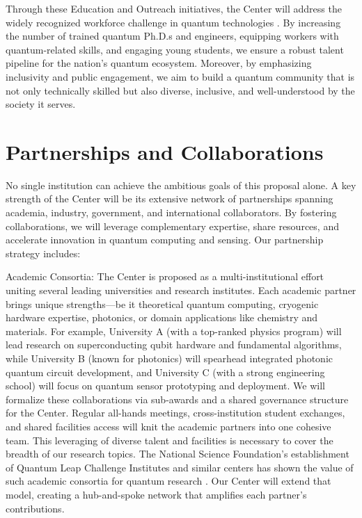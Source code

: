 \documentclass[12pt]{article}
\begin{document}
Through these Education and Outreach initiatives, the Center will address the widely recognized workforce challenge in quantum technologies . By increasing the number of trained quantum Ph.D.s and engineers, equipping workers with quantum-related skills, and engaging young students, we ensure a robust talent pipeline for the nation’s quantum ecosystem. Moreover, by emphasizing inclusivity and public engagement, we aim to build a quantum community that is not only technically skilled but also diverse, inclusive, and well-understood by the society it serves.



\section{Partnerships and Collaborations}



No single institution can achieve the ambitious goals of this proposal alone. A key strength of the Center will be its extensive network of partnerships spanning academia, industry, government, and international collaborators. By fostering collaborations, we will leverage complementary expertise, share resources, and accelerate innovation in quantum computing and sensing. Our partnership strategy includes:



Academic Consortia: The Center is proposed as a multi-institutional effort uniting several leading universities and research institutes. Each academic partner brings unique strengths—be it theoretical quantum computing, cryogenic hardware expertise, photonics, or domain applications like chemistry and materials. For example, University A (with a top-ranked physics program) will lead research on superconducting qubit hardware and fundamental algorithms, while University B (known for photonics) will spearhead integrated photonic quantum circuit development, and University C (with a strong engineering school) will focus on quantum sensor prototyping and deployment. We will formalize these collaborations via sub-awards and a shared governance structure for the Center. Regular all-hands meetings, cross-institution student exchanges, and shared facilities access will knit the academic partners into one cohesive team. This leveraging of diverse talent and facilities is necessary to cover the breadth of our research topics. The National Science Foundation’s establishment of Quantum Leap Challenge Institutes and similar centers has shown the value of such academic consortia for quantum research . Our Center will extend that model, creating a hub-and-spoke network that amplifies each partner’s contributions.
\end{document}
